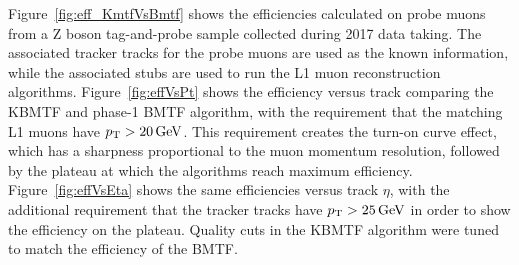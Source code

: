 Figure~\ref{fig:eff_KmtfVsBmtf} shows the efficiencies calculated on probe muons from a Z boson tag-and-probe sample collected during 2017 data taking. The associated tracker tracks for the probe muons are used as the known information, while the associated stubs are used to run the L1 muon reconstruction algorithms. Figure~\ref{fig:effVsPt} shows the efficiency versus track \pt comparing the KBMTF and phase-1 BMTF algorithm, with the requirement that the matching L1 muons have $p_{\mathrm{T}}>20\,\text{Ge\hspace{-.08em}V}$. This requirement creates the turn-on curve effect, which has a sharpness proportional to the muon momentum resolution, followed by the plateau at which the algorithms reach maximum efficiency. Figure~\ref{fig:effVsEta} shows the same efficiencies versus track $\eta$, with the additional requirement that the tracker tracks have $p_{\mathrm{T}}>25\,\text{Ge\hspace{-.08em}V}$ in order to show the efficiency on the plateau. Quality cuts in the KBMTF algorithm were tuned to match the efficiency of the BMTF.

